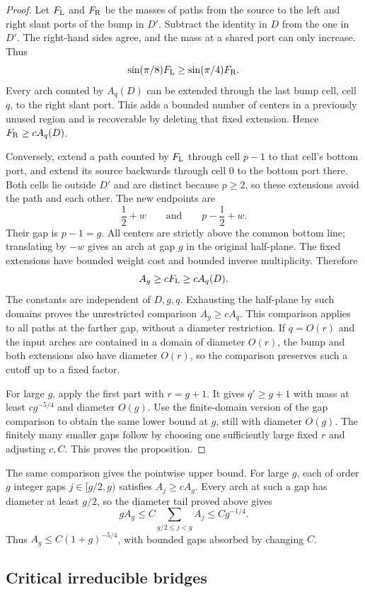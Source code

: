 \begin{proof}
Let $F_{\rm L}$ and $F_{\rm R}$ be the masses of paths from the
source to the left and right slant ports of the bump in $D'$.
Subtract the identity in $D$ from the one in $D'$.  The right-hand
sides agree, and the mass at a shared port can only increase.  Thus
\[
 \sin(\pi/8)F_{\rm L}\ge\sin(\pi/4)F_{\rm R}.
\]
Every arch counted by $A_q(D)$ can be extended through the last bump
cell, cell $q$, to the right slant port.  This adds a bounded number
of centers in a previously unused region and is recoverable by
deleting that fixed extension.  Hence $F_{\rm R}\ge cA_q(D)$.

Conversely, extend a path counted by $F_{\rm L}$ through cell $p-1$
to that cell's bottom port, and extend its source backwards through
cell $0$ to the bottom port there.  Both cells lie outside $D'$ and
are distinct because $p\ge2$, so these extensions avoid the path
and each other.  The new endpoints are
\[
 \frac12+w\qquad\text{and}\qquad p-\frac12+w.
\]
Their gap is $p-1=g$.  All centers are strictly above the common
bottom line; translating by $-w$ gives an arch at gap $g$ in the
original half-plane.  The fixed extensions have bounded weight cost
and bounded inverse multiplicity.  Therefore
\[
 A_g\ge cF_{\rm L}\ge cA_q(D).
\]
The constants are independent of $D,g,q$.  Exhausting the half-plane
by such domains proves the unrestricted comparison $A_g\ge cA_q$.
This comparison applies to all paths at the farther gap, without a
diameter restriction.  If $q=O(r)$ and the input arches are contained
in a domain of diameter $O(r)$, the bump and both extensions also
have diameter $O(r)$, so the comparison preserves such a cutoff up
to a fixed factor.

For large $g$, apply the first part with $r=g+1$.  It gives
$q'\ge g+1$ with mass at least $cg^{-5/4}$ and diameter $O(g)$.
Use the finite-domain version of the gap comparison to obtain the
same lower bound at $g$, still with diameter $O(g)$.  The finitely
many smaller gaps follow by choosing one sufficiently large fixed
$r$ and adjusting $c,C$.  This proves the proposition.
\end{proof}

The same comparison gives the pointwise upper bound. For large $g$,
each of order $g$ integer gaps $j\in[g/2,g)$ satisfies $A_j\ge cA_g$.
Every arch at such a gap has diameter at least $g/2$, so the diameter
tail proved above gives
\[
 gA_g\le C\sum_{g/2\le j<g}A_j\le Cg^{-1/4}.
\]
Thus $A_g\le C(1+g)^{-5/4}$, with bounded gaps absorbed by changing $C$.

\subsection{Critical irreducible bridges}\label{L:step17}

